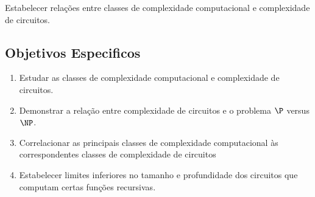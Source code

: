 Estabelecer relações entre classes de complexidade computacional
e complexidade de circuitos.

\subsection{Objetivos Especificos}

\begin{enumerate}
    \item Estudar as classes de complexidade computacional
        e complexidade de circuitos.
    \item Demonstrar a relação entre complexidade de circuitos
        e o problema $\P$ versus $\NP$.
    \item Correlacionar as principais classes
        de complexidade computacional
        às correspondentes classes de complexidade de circuitos
    \item Estabelecer limites inferiores no tamanho
        e profundidade dos circuitos
        que computam certas funções recursivas.
\end{enumerate}
